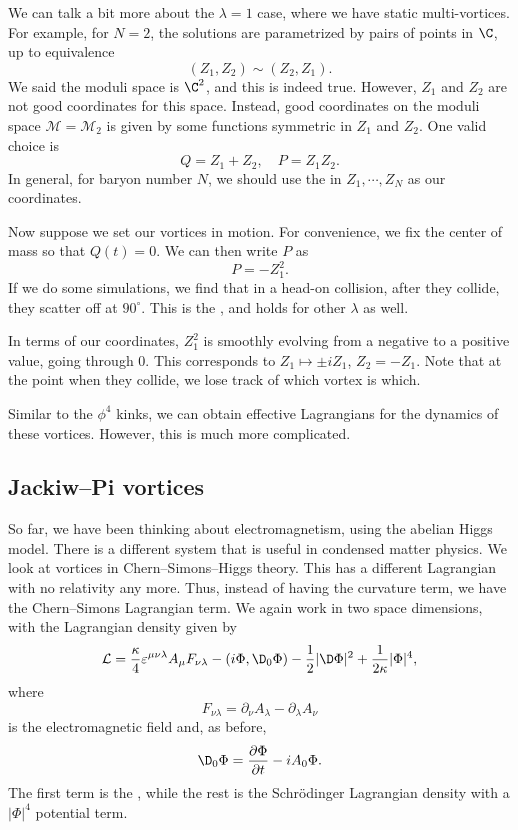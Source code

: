 \documentclass[a4paper]{article}
\begin{document}
We can talk a bit more about the $\lambda = 1$ case, where we have static multi-vortices. For example, for $N = 2$, the solutions are parametrized by pairs of points in $\C$, up to equivalence
\[
  (Z_1, Z_2) \sim (Z_2, Z_1).
\]
We said the moduli space is $\C^2$, and this is indeed true. However, $Z_1$ and $Z_2$ are not good coordinates for this space. Instead, good coordinates on the moduli space $\mathcal{M} = \mathcal{M}_2$ is given by some functions symmetric in $Z_1$ and $Z_2$. One valid choice is
\[
  Q = Z_1 + Z_2,\quad P = Z_1 Z_2.
\]
In general, for baryon number $N$, we should use the  in $Z_1, \cdots, Z_N$ as our coordinates.

Now suppose we set our vortices in motion. For convenience, we fix the center of mass so that $Q(t) = 0$. We can then write $P$ as
\[
  P = - Z_1^2.
\]
If we do some simulations, we find that in a head-on collision, after they collide, they scatter off at $90^\circ$. This is the , and holds for other $\lambda$ as well.

In terms of our coordinates, $Z_1^2$ is smoothly evolving from a negative to a positive value, going through $0$. This corresponds to $Z_1 \mapsto \pm i Z_1$, $Z_2 = - Z_1$. Note that at the point when they collide, we lose track of which vortex is which.

Similar to the $\phi^4$ kinks, we can obtain effective Lagrangians for the dynamics of these vortices. However, this is much more complicated.

\subsection{Jackiw--Pi vortices}
So far, we have been thinking about electromagnetism, using the abelian Higgs model. There is a different system that is useful in condensed matter physics. We look at vortices in Chern--Simons--Higgs theory. This has a different Lagrangian with no relativity any more. Thus, instead of having the curvature term, we have the Chern--Simons Lagrangian term. We again work in two space dimensions, with the Lagrangian density given by
\[
  \mathcal{L} = \frac{\kappa}{4} \varepsilon^{\mu\nu\lambda} A_\mu F_{\nu\lambda} - (i \Phi, \D_0 \Phi) - \frac{1}{2} | \D \Phi|^2 + \frac{1}{2\kappa} |\Phi|^4,
\]
where
\[
  F_{\nu \lambda} = \partial_\nu A_\lambda - \partial_\lambda A_\nu
\]
is the electromagnetic field and, as before,
\[
  \D_0 \Phi = \frac{\partial \Phi}{\partial t} - i A_0 \Phi.
\]
The first term is the , while the rest is the Schr\"odinger Lagrangian density with a $|\Phi|^4$ potential term.
\end{document}
